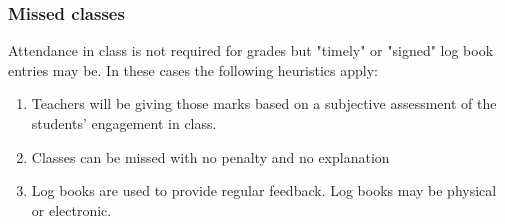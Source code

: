 \documentclass[twoside=false,DIV=14]{scrartcl}
\begin{document}
\subsubsection*{Missed classes}
Attendance in class is not required for grades but "timely" or "signed" log book entries may be.  In these cases the following heuristics apply:
\begin{enumerate}
\item Teachers will be giving those marks based on a subjective assessment of the students' engagement in class.  
\item Classes can be missed with no penalty and no explanation
\item Log books are used to provide regular feedback.  Log books may be physical or electronic.
\end{enumerate} 
\end{document}
